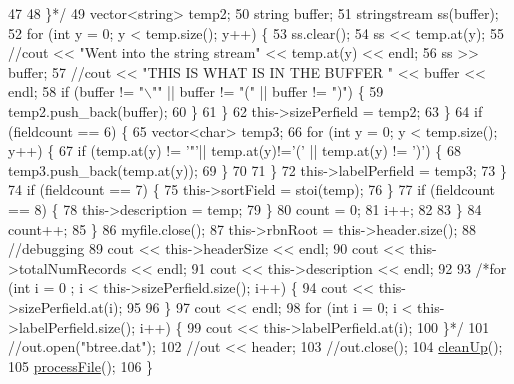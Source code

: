 \begin{DoxyCode}
47 \textcolor{comment}{}
48 \textcolor{comment}{                \}*/}
49                 vector<string> temp2;
50                 \textcolor{keywordtype}{string} buffer;
51                 stringstream ss(buffer);
52                 \textcolor{keywordflow}{for} (\textcolor{keywordtype}{int} y = 0; y < temp.size(); y++) \{
53                     ss.clear();
54                     ss << temp.at(y);
55                     \textcolor{comment}{//cout << "Went into the string stream" << temp.at(y) << endl;}
56                     ss >> buffer;
57                     \textcolor{comment}{//cout << "THIS IS WHAT IS IN THE BUFFER  " << buffer << endl;}
58                     \textcolor{keywordflow}{if} (buffer != \textcolor{stringliteral}{"\(\backslash\)""} || buffer != \textcolor{stringliteral}{"("} || buffer != \textcolor{stringliteral}{")"}) \{
59                         temp2.push\_back(buffer);
60                     \}
61                 \}
62                 this->sizePerfield = temp2;
63             \}
64             \textcolor{keywordflow}{if} (fieldcount == 6) \{
65                 vector<char> temp3;
66                 \textcolor{keywordflow}{for} (\textcolor{keywordtype}{int} y = 0; y < temp.size(); y++) \{
67                     \textcolor{keywordflow}{if} (temp.at(y) != \textcolor{charliteral}{'"'}|| temp.at(y)!=\textcolor{charliteral}{'('} || temp.at(y) != \textcolor{charliteral}{')'}) \{
68                         temp3.push\_back(temp.at(y));
69                     \}
70 
71                 \}
72                 this->labelPerfield = temp3;
73             \}
74             \textcolor{keywordflow}{if} (fieldcount == 7) \{
75                 this->sortField = stoi(temp);
76             \}
77             \textcolor{keywordflow}{if} (fieldcount == 8) \{
78                 this->description = temp;
79             \}
80             count = 0;
81             i++;
82             
83         \}
84         count++;
85     \}
86     myfile.close();
87     this->rbnRoot = this->header.size();
88     \textcolor{comment}{//debugging}
89     cout << this->headerSize << endl;
90     cout << this->totalNumRecords << endl;
91     cout << this->description << endl;
92 
93     \textcolor{comment}{/*for (int i = 0  ; i < this->sizePerfield.size(); i++) \{}
94 \textcolor{comment}{        cout << this->sizePerfield.at(i);}
95 \textcolor{comment}{        }
96 \textcolor{comment}{    \}}
97 \textcolor{comment}{    cout << endl;}
98 \textcolor{comment}{    for (int i = 0; i < this->labelPerfield.size(); i++) \{}
99 \textcolor{comment}{        cout << this->labelPerfield.at(i);}
100 \textcolor{comment}{    \}*/}
101     \textcolor{comment}{//out.open("btree.dat");}
102     \textcolor{comment}{//out << header;}
103     \textcolor{comment}{//out.close();}
104     \mbox{\hyperlink{classbplustreemk4_a6bca01d3bcc5461d899975b18c3d4c86}{cleanUp}}();
105     \mbox{\hyperlink{classbplustreemk4_abeaaa5003e7a3e2b0e99619ad718e14d}{processFile}}();
106 \}
\end{DoxyCode}


